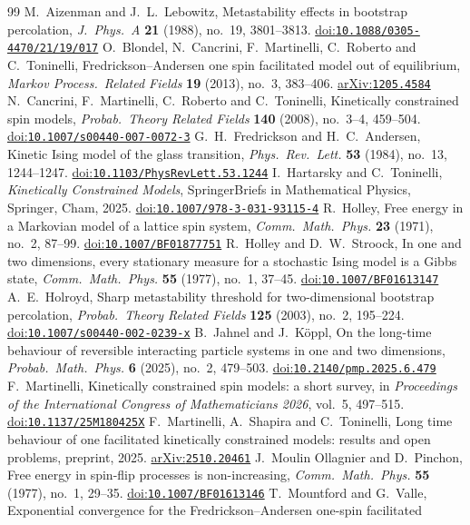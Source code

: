 \documentclass[11pt]{amsart}
\theoremstyle{remark}
\newcommand{\doi}[1]{\href{https://doi.org/#1}{doi:\nolinkurl{#1}}}
\newcommand{\arxiv}[1]{\href{https://arxiv.org/abs/#1}{arXiv:\nolinkurl{#1}}}
\begin{document}
\begin{thebibliography}{99}
 M.~Aizenman and J.~L.~Lebowitz, Metastability effects in bootstrap percolation, \emph{J.\ Phys.\ A}
\textbf{21} (1988), no.~19, 3801--3813. \doi{10.1088/0305-4470/21/19/017}
 O.~Blondel, N.~Cancrini, F.~Martinelli, C.~Roberto and C.~Toninelli, Fredrickson--Andersen one spin
facilitated model out of equilibrium, \emph{Markov Process.\ Related Fields} \textbf{19} (2013), no.~3, 383--406.
\arxiv{1205.4584}
 N.~Cancrini, F.~Martinelli, C.~Roberto and C.~Toninelli, Kinetically constrained spin models,
\emph{Probab.\ Theory Related Fields} \textbf{140} (2008), no.~3--4, 459--504. \doi{10.1007/s00440-007-0072-3}
 G.~H.~Fredrickson and H.~C.~Andersen, Kinetic Ising model of the glass transition, \emph{Phys.\ Rev.\
Lett.} \textbf{53} (1984), no.~13, 1244--1247. \doi{10.1103/PhysRevLett.53.1244}
\bibitem{HT25} I.~Hartarsky and C.~Toninelli, \emph{Kinetically Constrained Models}, SpringerBriefs in Mathematical
Physics, Springer, Cham, 2025. \doi{10.1007/978-3-031-93115-4}
 R.~Holley, Free energy in a Markovian model of a lattice spin system, \emph{Comm.\ Math.\ Phys.}
\textbf{23} (1971), no.~2, 87--99. \doi{10.1007/BF01877751}
 R.~Holley and D.~W.~Stroock, In one and two dimensions, every stationary measure for a stochastic Ising
model is a Gibbs state, \emph{Comm.\ Math.\ Phys.} \textbf{55} (1977), no.~1, 37--45. \doi{10.1007/BF01613147}
\bibitem{Hol03} A.~E.~Holroyd, Sharp metastability threshold for two-dimensional bootstrap percolation, \emph{Probab.\
Theory Related Fields} \textbf{125} (2003), no.~2, 195--224. \doi{10.1007/s00440-002-0239-x}
\bibitem{JK25} B.~Jahnel and J.~K\"oppl, On the long-time behaviour of reversible interacting particle systems in one
and two dimensions, \emph{Probab.\ Math.\ Phys.} \textbf{6} (2025), no.~2, 479--503. \doi{10.2140/pmp.2025.6.479}
\bibitem{Mar26} F.~Martinelli, Kinetically constrained spin models: a short survey, in \emph{Proceedings of the
International Congress of Mathematicians 2026}, vol.~5, 497--515. \doi{10.1137/25M180425X}
\bibitem{MST25} F.~Martinelli, A.~Shapira and C.~Toninelli, Long time behaviour of one facilitated kinetically
constrained models: results and open problems, preprint, 2025. \arxiv{2510.20461}
\bibitem{MOP77} J.~Moulin Ollagnier and D.~Pinchon, Free energy in spin-flip processes is non-increasing, \emph{Comm.\
Math.\ Phys.} \textbf{55} (1977), no.~1, 29--35. \doi{10.1007/BF01613146}
\bibitem{MV19} T.~Mountford and G.~Valle, Exponential convergence for the Fredrickson--Andersen one-spin facilitated

\end{thebibliography}
\end{document}
